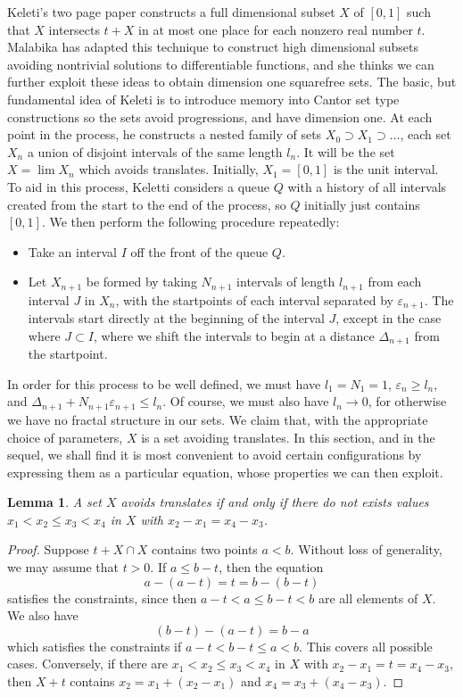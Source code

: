 \documentclass{report}
\theoremstyle{plain}
\newtheorem{lemma}{Lemma}
\theoremstyle{plain}
\begin{document}
Keleti's two page paper constructs a full dimensional subset $X$ of $[0,1]$ such that $X$ intersects $t + X$ in at most one place for each nonzero real number $t$. Malabika has adapted this technique to construct high dimensional subsets avoiding nontrivial solutions to differentiable functions, and she thinks we can further exploit these ideas to obtain dimension one squarefree sets. The basic, but fundamental idea of Keleti is to introduce memory into Cantor set type constructions so the sets avoid progressions, and have dimension one. At each point in the process, he constructs a nested family of sets $X_0 \supset X_1 \supset \dots$, each set $X_n$ a union of disjoint intervals of the same length $l_n$. It will be the set $X = \lim X_n$ which avoids translates. Initially, $X_1 = [0,1]$ is the unit interval. To aid in this process, Keletti considers a queue $Q$ with a history of all intervals created from the start to the end of the process, so $Q$ initially just contains $[0,1]$. We then perform the following procedure repeatedly:
%
\begin{itemize}
    \item Take an interval $I$ off the front of the queue $Q$.

    \item Let $X_{n+1}$ be formed by taking $N_{n+1}$ intervals of length $l_{n+1}$ from each interval $J$ in $X_n$, with the startpoints of each interval separated by $\varepsilon_{n+1}$. The intervals start directly at the beginning of the interval $J$, except in the case where $J \subset I$, where we shift the intervals to begin at a distance $\Delta_{n+1}$ from the startpoint.
\end{itemize}
%
In order for this process to be well defined, we must have $l_1 = N_1 = 1$, $\varepsilon_n \geq l_n$, and $\Delta_{n+1} + N_{n+1} \varepsilon_{n+1} \leq l_n$. Of course, we must also have $l_n \to 0$, for otherwise we have no fractal structure in our sets. We claim that, with the appropriate choice of parameters, $X$ is a set avoiding translates. In this section, and in the sequel, we shall find it is most convenient to avoid certain configurations by expressing them as a particular equation, whose properties we can then exploit.

\begin{lemma}
    A set $X$ avoids translates if and only if there do not exists values $x_1 < x_2 \leq x_3 < x_4$ in $X$ with $x_2 - x_1 = x_4 - x_3$.
\end{lemma}
\begin{proof}

    Suppose $t + X \cap X$ contains two points $a < b$. Without loss of generality, we may assume that $t > 0$. If $a \leq b - t$, then the equation
    \[ a - (a - t) = t = b - (b - t) \]
    satisfies the constraints, since then $a - t < a \leq b - t < b$ are all elements of $X$. We also have
    \[ (b - t) - (a - t) = b - a \]
    which satisfies the constraints if $a - t < b - t \leq a < b$. This covers all possible cases. Conversely, if there are $x_1 < x_2 \leq x_3 < x_4$ in $X$ with $x_2 - x_1 = t = x_4 - x_3$, then $X + t$ contains $x_2 = x_1 + (x_2 - x_1)$ and $x_4 = x_3 + (x_4 - x_3)$.
\end{proof}
\end{document}
